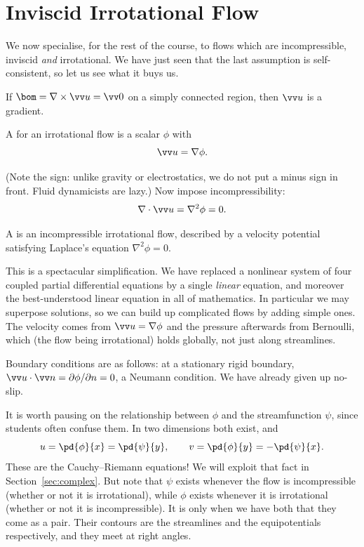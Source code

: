 \section{Inviscid Irrotational Flow}

We now specialise, for the rest of the course, to flows which are incompressible, inviscid \emph{and} irrotational. We have just seen that the last assumption is self-consistent, so let us see what it buys us.

If $\bom = \nabla \times \vv u = \vv 0$ on a simply connected region, then $\vv u$ is a gradient.

\begin{definition}
	A  for an irrotational flow is a scalar $\phi$ with
	$$
	\vv u = \nabla \phi.
	$$
\end{definition}

(Note the sign: unlike gravity or electrostatics, we do not put a minus sign in front. Fluid dynamicists are lazy.) Now impose incompressibility:
$$
\nabla \cdot \vv u = \nabla^2 \phi = 0.
$$

\begin{definition}
	A  is an incompressible irrotational flow, described by a velocity potential satisfying Laplace's equation $\nabla^2 \phi = 0$.
\end{definition}

This is a spectacular simplification. We have replaced a nonlinear system of four coupled partial differential equations by a single \emph{linear} equation, and moreover the best-understood linear equation in all of mathematics. In particular we may superpose solutions, so we can build up complicated flows by adding simple ones. The velocity comes from $\vv u = \nabla \phi$ and the pressure afterwards from Bernoulli, which (the flow being irrotational) holds globally, not just along streamlines.

Boundary conditions are as follows: at a stationary rigid boundary, $\vv u \cdot \vv n = \partial \phi/\partial n = 0$, a Neumann condition. We have already given up no-slip.

It is worth pausing on the relationship between $\phi$ and the streamfunction $\psi$, since students often confuse them. In two dimensions both exist, and
$$
u = \pd{\phi}{x} = \pd{\psi}{y}, \qquad v = \pd{\phi}{y} = -\pd{\psi}{x}.
$$
These are the Cauchy--Riemann equations! We will exploit that fact in Section~\ref{sec:complex}. But note that $\psi$ exists whenever the flow is incompressible (whether or not it is irrotational), while $\phi$ exists whenever it is irrotational (whether or not it is incompressible). It is only when we have both that they come as a pair. Their contours are the streamlines and the equipotentials respectively, and they meet at right angles.


